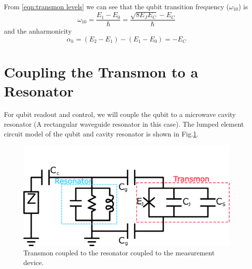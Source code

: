 From \ref{eqn:transmon levels} we can see that the qubit transition frequency ($\omega_{10}$) is
\begin{equation}
\omega_{10}=\frac{E_1-E_0}{\hbar}=\frac{\sqrt{8E_JE_C}-E_C}{\hbar}
\end{equation}
and the anharmonicity
\begin{equation}
\alpha_h=(E_2-E_1)-(E_1-E_0)=-E_C
\end{equation}

\section{Coupling the Transmon to a Resonator}

For qubit readout and control, we will couple the qubit to a microwave cavity resonator (A rectangular waveguide resonator in this case). The lumped element circuit model of the qubit and cavity resonator is shown in Fig.\ref{fig:transmon with cavity}.

\begin{figure}
\centering
\includegraphics[width=\linewidth]{Figures/transmon_circuit.png}
\decoRule
\caption[Transmon Circuit]{Transmon coupled to the resonator coupled to the measurement device.}
\label{fig:transmon with cavity}
\end{figure}

